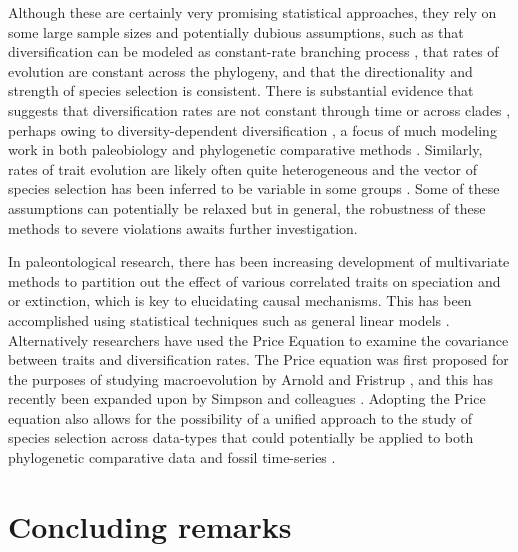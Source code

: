 Although these are certainly very promising statistical approaches, they rely on some large sample sizes and potentially dubious assumptions, such as that diversification can be modeled as constant-rate branching process \citep[i.e., a ``birth-death'' model;][]{Kendall1948}, that rates of evolution are constant across the phylogeny, and that the directionality and strength of species selection is consistent. There is substantial evidence that suggests that diversification rates are not constant through time or across clades \citep{Rabosky2007, McPeek2008, PhillimorePrice2008, Alfaro2009, Rabosky2012, Rabosky2013}, perhaps owing to diversity-dependent diversification \citep{Sepkoski1984, Alroy2008, Rabosky2009}, a focus of much modeling work in both paleobiology \citep{Roy1996,  Eble2000, Sepkoski2000} and phylogenetic comparative methods \citep{Rabosky2008, Etienne2012, Etienne2012AmNat}. Similarly, rates of trait evolution are likely often quite heterogeneous \citep{Eastman2011, Beaulieu2013} and the vector of species selection has been inferred to be variable in some groups \citep{Jablonski1986, Simpson2010, Harnik2012}. Some of these assumptions can potentially be relaxed \citep{RaboskyGlor2010} but in general, the robustness of these methods to severe violations awaits further investigation.

In paleontological research, there has been increasing development of multivariate methods to partition out the effect of various correlated traits on speciation and or extinction, which is key to elucidating causal mechanisms. This has been accomplished using statistical techniques such as general linear models \citep[i.e., predict lineages' diversification rates or durations in the fossil record from lineage-specific traits;][]{JablonskiHunt2006, Harnik2011, Harnik2012}. Alternatively researchers have used the Price Equation \citep{Price1972, Rice2004, Okasha2006, Frank2012} to examine the covariance between traits and diversification rates. The Price equation was first proposed for the purposes of studying macroevolution by Arnold and Fristrup \citep{ArnoldFristrup1982}, and this has recently been expanded upon by Simpson and colleagues \citep{SimpsonHarnik2009, Simpson2010}. Adopting the Price equation also allows for the possibility of a unified approach to the study of species selection across data-types that could potentially be applied to both phylogenetic comparative data and fossil time-series \citep{Jablonski2008,Simpson2013}. 

\section{Concluding remarks}

